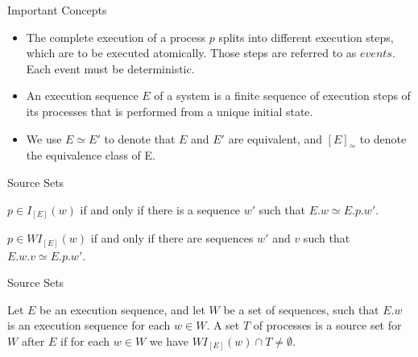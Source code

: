 \documentclass[9pt]{beamer}
\begin{document}

\begin{frame} {Important Concepts}

\begin{itemize}[<+->]
    \item The complete execution of a process $p$ splits into different execution steps, which are
    to be executed atomically. Those steps are referred to as $events$. Each event must be deterministic.
    \item An execution sequence $E$ of a system is a finite sequence of execution steps
    of its processes that is performed from a unique initial state.
    \item We use $E \simeq E'$ to denote that $E$ and $E'$ are
    equivalent, and $[E]_{\simeq}$ to denote the equivalence class of E.
\end{itemize}

\end{frame}

\begin{frame}{Source Sets}

\begin{definition}
    $p \in I_{[E]}(w)$ if and only if there is a sequence $w'$ such that $E.w \simeq E.p.w'$.
\end{definition}


\begin{definition}

$p \in WI_{[E]}(w)$ if and only if there are sequences $w'$ and $v$ such
that $E.w.v \simeq E.p.w'$.

\end{definition}
    
\end{frame}


\begin{frame}{Source Sets}

\begin{definition}
Let $E$ be an execution sequence,
and let $W$ be a set of sequences, such that $E.w$ is an execution
sequence for each $w \in W$. A set $T$ of processes is a source set for
$W$ after $E$ if for each $w \in W$ we have $WI_{[E]}(w) \cap T  \neq \emptyset$.
\end{definition}

\end{frame}
\end{document}
